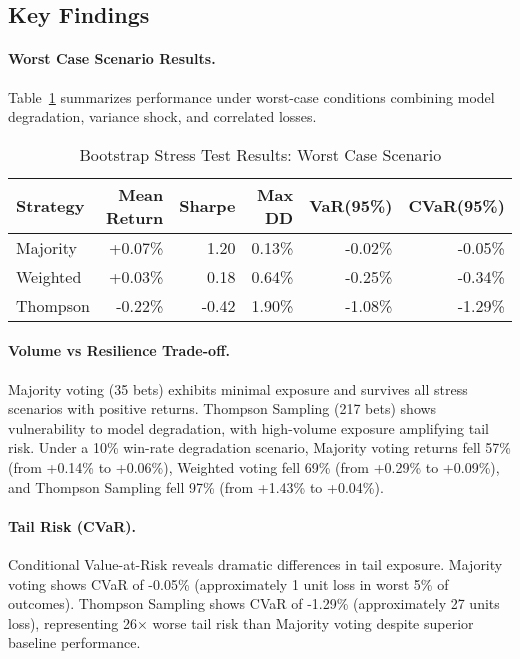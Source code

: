 \subsection{Key Findings}

\paragraph{Worst Case Scenario Results.}
Table~\ref{tab:bootstrap-worst-case} summarizes performance under worst-case conditions combining model degradation, variance shock, and correlated losses.

\begin{table}[htbp]
\centering
\caption{Bootstrap Stress Test Results: Worst Case Scenario}
\label{tab:bootstrap-worst-case}
\begin{tabular}{@{} l r r r r r @{}}
\toprule
Strategy & Mean Return & Sharpe & Max DD & VaR(95\%) & CVaR(95\%) \\
\midrule
Majority & +0.07\% & 1.20 & 0.13\% & -0.02\% & -0.05\% \\
Weighted & +0.03\% & 0.18 & 0.64\% & -0.25\% & -0.34\% \\
Thompson & -0.22\% & -0.42 & 1.90\% & -1.08\% & -1.29\% \\
\bottomrule
\end{tabular}
\end{table}

\paragraph{Volume vs Resilience Trade-off.}
Majority voting (35 bets) exhibits minimal exposure and survives all stress scenarios with positive returns. Thompson Sampling (217 bets) shows vulnerability to model degradation, with high-volume exposure amplifying tail risk. Under a 10\% win-rate degradation scenario, Majority voting returns fell 57\% (from +0.14\% to +0.06\%), Weighted voting fell 69\% (from +0.29\% to +0.09\%), and Thompson Sampling fell 97\% (from +1.43\% to +0.04\%).

\paragraph{Tail Risk (CVaR).}
Conditional Value-at-Risk reveals dramatic differences in tail exposure. Majority voting shows CVaR of -0.05\% (approximately 1 unit loss in worst 5\% of outcomes). Thompson Sampling shows CVaR of -1.29\% (approximately 27 units loss), representing 26× worse tail risk than Majority voting despite superior baseline performance.

